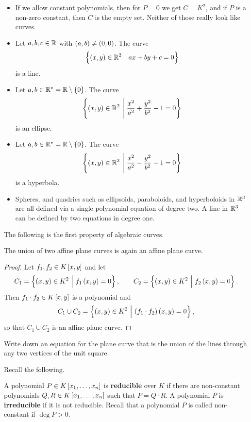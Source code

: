 \begin{example}
\hfill
\begin{itemize}
\item If we allow constant polynomials, then for $ P = 0 $ we get $ C = K^2 $, and if $ P $ is a non-zero constant, then $ C $ is the empty set. Neither of those really look like curves.
\item Let $ a, b, c \in \mathbb{R} $ with $ \br{a, b} \ne \br{0, 0} $. The curve
$$ \cbr{\br{x, y} \in \RR^2 \st ax + by + c = 0} $$
is a line.
\item Let $ a, b \in \RR^* = \RR \setminus \cbr{0} $. The curve
$$ \cbr{\br{x, y} \in \RR^2 \st \dfrac{x^2}{a^2} + \dfrac{y^2}{b^2} - 1 = 0} $$
is an ellipse.
\item Let $ a, b \in \RR^* = \RR \setminus \cbr{0} $. The curve
$$ \cbr{\br{x, y} \in \RR^2 \st \dfrac{x^2}{a^2} - \dfrac{y^2}{b^2} - 1 = 0} $$
is a hyperbola.
\item Spheres, and quadrics such as ellipsoids, paraboloids, and hyperboloids in $ \mathbb{R}^3 $ are all defined via a single polynomial equation of degree two. A line in $ \mathbb{R}^3 $ can be defined by two equations in degree one.
\end{itemize}
\end{example}

\pagebreak

The following is the first property of algebraic curves.

\begin{lemma}
\label{lem:1.7}
The union of two affine plane curves is again an affine plane curve.
\end{lemma}

\begin{proof}
Let $ f_1, f_2 \in K\sbr{x, y} $ and let
$$ C_1 = \cbr{\br{x, y} \in K^2 \st f_1\br{x, y} = 0}, \qquad C_2 = \cbr{\br{x, y} \in K^2 \st f_2\br{x, y} = 0}. $$
Then $ f_1 \cdot f_2 \in K\sbr{x, y} $ is a polynomial and
$$ C_1 \cup C_2 = \cbr{\br{x, y} \in K^2 \st \br{f_1 \cdot f_2}\br{x, y} = 0}, $$
so that $ C_1 \cup C_2 $ is an affine plane curve.
\end{proof}

\begin{exercise**}
Write down an equation for the plane curve that is the union of the lines through any two vertices of the unit square.
\end{exercise**}

Recall the following.

\begin{definition}
A polynomial $ P \in K\sbr{x_1, \dots, x_n} $ is \textbf{reducible} over $ K $ if there are non-constant polynomials $ Q, R \in K\sbr{x_1, \dots, x_n} $ such that $ P = Q \cdot R $. A polynomial $ P $ is \textbf{irreducible} if it is not reducible. Recall that a polynomial $ P $ is called non-constant if $ \deg P > 0 $.
\end{definition}

